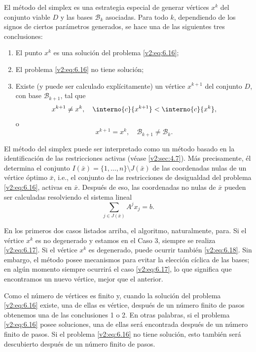 El método del simplex es una estrategia especial de generar vértices $x^k$ del conjunto viable $D$ y las bases $\mathcal{B}_k$ asociadas. Para todo $k$, dependiendo de los signos de ciertos parámetros generados, se hace una de las siguientes tres conclusiones:
\begin{enumerate}[label=\arabic*., itemsep=0.1cm, topsep=0.1cm]
    \item El punto $x^k$ es una solución del problema \eqref{v2:eq:6.16};
    \item El problema \eqref{v2:eq:6.16} no tiene solución;
    \item Existe (y puede ser calculado explícitamente) un vértice $x^{k+1}$ del conjunto $D$, con base $\mathcal{B}_{k+1}$, tal que
    \begin{equation}
        x^{k+1} \neq x^k, \quad \interno{c}{x^{k+1}} < \interno{c}{x^k},
        \label{v2:eq:6.17}
    \end{equation}
    o
    \begin{equation}
        x^{k+1} = x^k, \quad \mathcal{B}_{k+1} \neq \mathcal{B}_k.
        \label{v2:eq:6.18}
    \end{equation}
\end{enumerate}

El método del simplex puede ser interpretado como un método basado en la identificación de las restricciones activas (véase \cref{v2:sec:4.7}). Más precisamente, él determina el conjunto $I(\bar{x}) = \{1, \dots, n\} \setminus J(\bar{x})$ de las coordenadas nulas de un vértice óptimo $\bar{x}$, i.e., el conjunto de las restricciones de desigualdad del problema \eqref{v2:eq:6.16}, activas en $\bar{x}$. Después de eso, las coordenadas no nulas de $\bar{x}$ pueden ser calculadas resolviendo el sistema lineal
\[
    \sum_{j \in J(\bar{x})} A^j x_j = b.
\]

En los primeros dos casos listados arriba, el algoritmo, naturalmente, para. Si el vértice $x^k$ es no degenerado y estamos en el Caso 3, siempre se realiza \eqref{v2:eq:6.17}. Si el vértice $x^k$ es degenerado, puede ocurrir también \eqref{v2:eq:6.18}. Sin embargo, el método posee mecanismos para evitar la elección cíclica de las bases; en algún momento siempre ocurrirá el caso \eqref{v2:eq:6.17}, lo que significa que encontramos un nuevo vértice, mejor que el anterior.

Como el número de vértices es finito y, cuando la solución del problema \eqref{v2:eq:6.16} existe, una de ellas es vértice, después de un número finito de pasos obtenemos una de las conclusiones 1 o 2. En otras palabras, si el problema \eqref{v2:eq:6.16} posee soluciones, una de ellas será encontrada después de un número finito de pasos. Si el problema \eqref{v2:eq:6.16} no tiene solución, esto también será descubierto después de un número finito de pasos.


